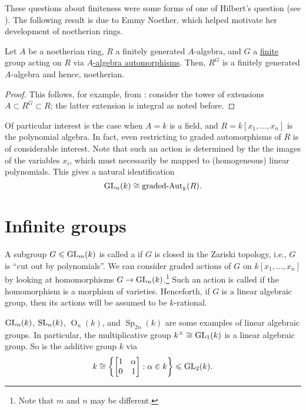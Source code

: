 \documentclass[12pt]{article}
\begin{document}
These questions about finiteness were some forms of one of Hilbert's question (see ). The following result is due to Emmy Noether, which helped motivate her development of noetherian rings.

\begin{thm}[Noether] \label{thm:noether-finitely-generated}
	Let $A$ be a noetherian ring, $R$ a finitely generated $A$-algebra, and $G$ a \underline{finite} group acting on $R$ via \underline{$A$-algebra automorphisms}. Then, $R^{G}$ is a finitely generated $A$-algebra and hence, noetherian.
\end{thm}
\begin{proof}
	This follows, for example, from \cite[Proposition 7.8]{AtiyahMacdonald}: consider the tower of extensions $A \subset R^{G} \subset R$; the latter extension is integral as noted before.
\end{proof}

Of particular interest is the case when $A = k$ is a field, and $R = k[x_{1}, \ldots, x_{n}]$ is the polynomial algebra. In fact, even restricting to graded automorphisms of $R$ is of considerable interest. Note that such an action is determined by the the images of the variables $x_{i}$, which must necessarily be mapped to (homogeneous) linear polynomials. This gives a natural identification 
\begin{equation*} 
	\operatorname{GL}_{n}(k) \cong \operatorname{graded-Aut}_{k}(R).
\end{equation*}

\section{Infinite groups}

A subgroup $G \leqslant \operatorname{GL}_{m}(k)$ is called a  if $G$ is closed in the Zariski topology, i.e., $G$ is ``cut out by polynomials''. We can consider graded actions of $G$ on $k[x_{1}, \ldots, x_{n}]$ by looking at homomorphisms $G \to \operatorname{GL}_{n}(k)$.\footnote{Note that $m$ and $n$ may be different.} Such an action is called  if the homomorphism is a morphism of varieties. Henceforth, if $G$ is a linear algebraic group, then its actions will be assumed to be $k$-rational.

\begin{ex}
	$\operatorname{GL}_{n}(k)$, $\operatorname{SL}_{n}(k)$, $\operatorname{O}_{n}(k)$, and $\operatorname{Sp}_{2n}(k)$ are some examples of linear algebraic groups. In particular, the multiplicative group $k^{\times} \cong \operatorname{GL}_{1}(k)$ is a linear algebraic group. So is the additive group $k$ via
	\begin{equation*} 
		k \cong \left\{\begin{bmatrix} 1 & \alpha \\ 0 & 1 \end{bmatrix} : \alpha \in k\right\} \leqslant \operatorname{GL}_{2}(k).
	\end{equation*}
\end{ex}
\end{document}
